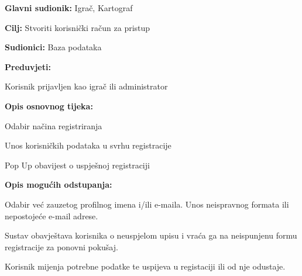 \noindent {}
\begin{packed_item}
	\item \textbf{Glavni sudionik: } Igrač, Kartograf
	\item  \textbf{Cilj:} Stvoriti korisnički račun za pristup
	\item  \textbf{Sudionici:} Baza podataka
    \item \textbf{Preduvjeti:} 
    \item[] \begin{packed_enum}
        \item Korisnik prijavljen kao igrač ili administrator
    \end{packed_enum}
	\item  \textbf{Opis osnovnog tijeka:}
	\item[] \begin{packed_enum}
	\item Odabir načina registriranja
	\item Unos korisničkih podataka u svrhu registracije
    \item Pop Up obavijest o uspješnoj registraciji
	\end{packed_enum}
	\item  \textbf{Opis mogućih odstupanja:}
	\item[] \begin{packed_enum}
	    \item Odabir već zauzetog profilnog imena i/ili e-maila. Unos neispravnog formata ili nepostojeće e-mail adrese.
        \item[] \begin{packed_enum}
        	\item Sustav obavještava korisnika o neuspjelom upisu i vraća ga na neispunjenu formu registracije za ponovni pokušaj.
            \item Korisnik mijenja potrebne podatke te uspijeva u registaciji ili od nje odustaje.
        \end{packed_enum}
	\end{packed_enum}
\end{packed_item}

